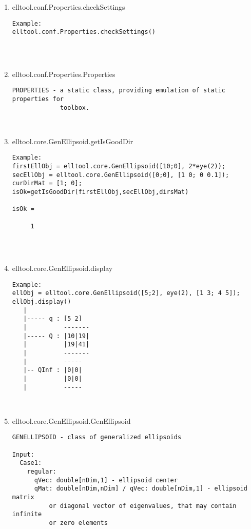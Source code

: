 \begin{enumerate}
\begin{lstlisting}
\end{lstlisting}
\fontfamily{\familydefault}
\selectfont
\item {elltool.conf.Properties.checkSettings}
\selectfont
\begin{lstlisting}
Example:
elltool.conf.Properties.checkSettings()




\end{lstlisting}
\fontfamily{\familydefault}
\selectfont
\item {elltool.conf.Properties.Properties}
\selectfont
\begin{lstlisting}
PROPERTIES - a static class, providing emulation of static properties for
             toolbox.



\end{lstlisting}
\fontfamily{\familydefault}
\selectfont
\item {elltool.core.GenEllipsoid.getIsGoodDir}
\selectfont
\begin{lstlisting}
Example:
firstEllObj = elltool.core.GenEllipsoid([10;0], 2*eye(2));
secEllObj = elltool.core.GenEllipsoid([0;0], [1 0; 0 0.1]);
curDirMat = [1; 0];
isOk=getIsGoodDir(firstEllObj,secEllObj,dirsMat)

isOk =

     1




\end{lstlisting}
\fontfamily{\familydefault}
\selectfont
\item {elltool.core.GenEllipsoid.display}
\selectfont
\begin{lstlisting}
Example:
ellObj = elltool.core.GenEllipsoid([5;2], eye(2), [1 3; 4 5]);
ellObj.display()
   |
   |----- q : [5 2]
   |          -------
   |----- Q : |10|19|
   |          |19|41|
   |          -------
   |          -----
   |-- QInf : |0|0|
   |          |0|0|
   |          -----



\end{lstlisting}
\fontfamily{\familydefault}
\selectfont
\item {elltool.core.GenEllipsoid.GenEllipsoid}
\selectfont
\begin{lstlisting}
GENELLIPSOID - class of generalized ellipsoids

Input:
  Case1:
    regular:
      qVec: double[nDim,1] - ellipsoid center
      qMat: double[nDim,nDim] / qVec: double[nDim,1] - ellipsoid matrix
          or diagonal vector of eigenvalues, that may contain infinite
          or zero elements


\end{lstlisting}
\end{enumerate}
